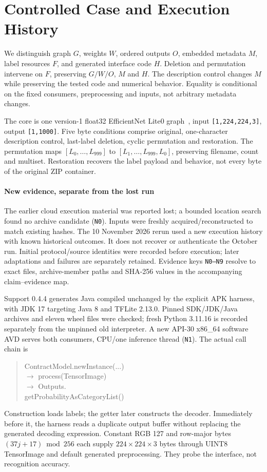 \documentclass[10pt,conference]{IEEEtran}
\newcommand{\code}[1]{\texttt{#1}}
\begin{document}
\section{Controlled Case and Execution History}
\label{sec:setup}
We distinguish graph $G$, weights $W$, ordered outputs $O$, embedded metadata $M$, label resources $F$, and generated interface code $H$. Deletion and permutation intervene on $F$, preserving $G/W/O$, $M$ and $H$. The description control changes $M$ while preserving the tested code and numerical behavior. Equality is conditional on the fixed consumers, preprocessing and inputs, not arbitrary metadata changes.

The core is one version-1 float32 EfficientNet Lite0 graph~\cite{efficientnet}, input \code{[1,224,224,3]}, output \code{[1,1000]}. Five byte conditions comprise original, one-character description control, last-label deletion, cyclic permutation and restoration. The permutation maps $[L_0,\ldots,L_{999}]$ to $[L_1,\ldots,L_{999},L_0]$, preserving filename, count and multiset. Restoration recovers the label payload and behavior, not every byte of the original ZIP container.

\paragraph{New evidence, separate from the lost run}
The earlier cloud execution material was reported lost; a bounded location search found no archive candidate (\code{N0}). Inputs were freshly acquired/reconstructed to match existing hashes. The 10 November 2026 rerun used a new execution history with known historical outcomes. It does not recover or authenticate the October run. Initial protocol/source identities were recorded before execution; later adaptations and failures are separately retained. Evidence keys \code{N0--N9} resolve to exact files, archive-member paths and SHA-256 values in the accompanying claim--evidence map.

Support 0.4.4 generates Java compiled unchanged by the explicit APK harness, with JDK 17 targeting Java 8 and TFLite 2.13.0. Pinned SDK/JDK/Java archives and eleven wheel files were checked; fresh Python 3.11.16 is recorded separately from the unpinned old interpreter. A new API-30 x86\_64 software AVD serves both consumers, CPU/one inference thread (\code{N1}). The actual call chain is
\begin{quote}\small\ttfamily\raggedright
ContractModel.newInstance(...)\\
\(\rightarrow\) process(TensorImage)\\
\(\rightarrow\) Outputs.\\
\hspace*{1em}getProbabilityAsCategoryList()
\end{quote}
Construction loads labels; the getter later constructs the decoder. Immediately before it, the harness reads a duplicate output buffer without replacing the generated decoding expression. Constant RGB 127 and row-major bytes $(37j+17)\bmod256$ each supply $224\times224\times3$ bytes through UINT8 TensorImage and default generated preprocessing. They probe the interface, not recognition accuracy.
\end{document}
